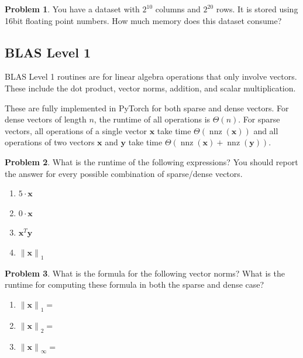 \documentclass[10pt]{article}
\theoremstyle{definition}
\newtheorem{problem}{Problem}
\DeclareMathOperator{\nnz}{nnz}
\newcommand{\trans}[1]{{#1}^{T}}
\newcommand{\x}{\mathbf x}
\newcommand{\y}{\mathbf y}
\newcommand{\lone}[1]{{\lVert {#1} \rVert}_1}
\newcommand{\ltwo}[1]{{\lVert {#1} \rVert}_2}
\newcommand{\lp}[1]{{\lVert {#1} \rVert}_p}
\newcommand{\linf}[1]{{\lVert {#1} \rVert}_\infty}
\begin{document}
\begin{problem}
    You have a dataset with $2^{10}$ columns and $2^{20}$ rows.
    It is stored using 16bit floating point numbers.
    How much memory does this dataset consume?
    \vspace{4in}
\end{problem}

\newpage
\subsection{BLAS Level 1}

BLAS Level 1 routines are for linear algebra operations that only involve vectors.
These include the dot product, vector norms, addition, and scalar multiplication.

These are fully implemented in PyTorch for both sparse and dense vectors.
For dense vectors of length $n$, the runtime of all operations is $\Theta(n)$.
For sparse vectors, all operations of a single vector $\x$ take time $\Theta(\nnz(\x))$
and all operations of two vectors $\x$ and $\y$ take time $\Theta(\nnz(\x)+\nnz(\y))$.

\begin{problem}
    What is the runtime of the following expressions?
    You should report the answer for every possible combination of sparse/dense vectors.
    \begin{enumerate}
        \item $5 \cdot \x$
            \vspace{2in}
        \item $0 \cdot \x$
            \vspace{2in}
        \item $\trans\x \y$
            \vspace{2in}
        \item $\lone{\x}$
            \vspace{2in}
    \end{enumerate}
\end{problem}

\begin{problem}
    What is the formula for the following vector norms?
    What is the runtime for computing these formula in both the sparse and dense case?
    \begin{enumerate}
        \item $\lone{\x}=$
            \vspace{2in}
        \item $\ltwo{\x}=$
            \vspace{2in}
        \item $\linf{\x}=$
            \vspace{2in}
    \end{enumerate}
\end{problem}
\end{document}
